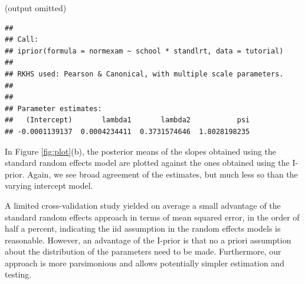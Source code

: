 \begin{knitrout}
\color{fgcolor}\begin{kframe}
\begin{alltt}
 \hlkwb{<-}  \hlopt{~}  \hlopt{*}   
\end{alltt}
\end{kframe}
\end{knitrout}
(output omitted)
\begin{knitrout}
\color{fgcolor}\begin{kframe}
\begin{verbatim}
## 
## Call:
## iprior(formula = normexam ~ school * standlrt, data = tutorial)
## 
## RKHS used: Pearson & Canonical, with multiple scale parameters.
## 
## 
## Parameter estimates:
##   (Intercept)       lambda1       lambda2           psi 
## -0.0001139137  0.0004234411  0.3731574646  1.8028198235
\end{verbatim}
\end{kframe}
\end{knitrout}

In Figure \ref{fig:plot}(b), the posterior means of the slopes obtained using the standard random effects model are plotted against the ones obtained using the I-prior. Again, we see broad agreement of the estimates, but much less so than the varying intercept model.

A limited cross-validation study yielded on average a small advantage of the standard random effects approach in terms of mean squared error, in the order of half a percent, indicating the iid assumption in the random effects models is reasonable. However, an advantage of the I-prior is that no a priori assumption about the distribution of the parameters need to be made. Furthermore, our approach is more parsimonious and allows potentially simpler estimation and testing.

%
%
%
